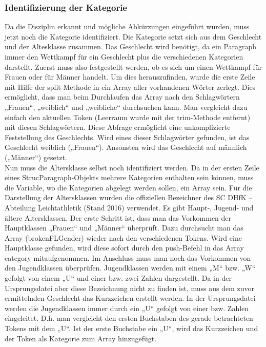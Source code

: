 {\subsubsection{Identifizierung der Kategorie}
Da die Disziplin erkannt und mögliche Abkürzungen eingeführt wurden, muss jetzt noch die Kategorie identifiziert. Die Kategorie setzt sich aus dem Geschlecht und der Altesklasse zusammen. Das Geschlecht wird benötigt, da ein Paragraph immer den Wettkampf für ein Geschlecht plus die verschiedenen Kategorien darstellt. Zuerst muss also festgestellt werden, ob es sich um einen Wettkampf für Frauen oder für Männer handelt. Um dies herauszufinden, wurde die erste Zeile mit Hilfe der split-Methode in ein Array aller vorhandenen Wörter zerlegt. Dies ermöglicht, dass man beim Durchlaufen das Array nach den Schlagwörtern „Frauen“, „weiblich“ und „weibliche“ durchsuchen kann. Man vergleicht dazu einfach den aktuellen Token (Leerraum wurde mit der trim-Methode entfernt) mit diesen Schlagwörtern. Diese Abfrage ermöglicht eine unkomplizierte Feststellung des Geschlechts. Wird eines dieser Schlagwörter gefunden, ist das Geschlecht weiblich („Frauen“). Ansonsten wird das Geschlecht auf männlich („Männer“) gesetzt. \\
Nun muss die Altersklasse selbst noch identifiziert werden. Da in der ersten Zeile eines StrucParagraph-Objekts mehrere Kategorien enthalten sein können, muss die Variable, wo die Kategorien abgelegt werden sollen, ein Array sein. Für die Darstellung der Altersklassen wurden die offiziellen Bezeichner des SC DHfK – Abteilung Leichtathletik (Stand 2016) verwendet. Es gibt Haupt-, Jugend- und ältere Altersklassen.  Der erste Schritt ist, dass man das Vorkommen der Hauptklassen „Frauen“ und „Männer“ überprüft. Dazu durchsucht man das Array (brokenFLGender) wieder nach den verschiedenen Tokens. Wird eine Hauptklasse gefunden, wird diese sofort durch den push-Befehl in das Array category mitaufgenommen.
Im Anschluss muss man noch das Vorkommen von den Jugendklassen überprüfen. Jugendklassen werden mit einem „M“ bzw. „W“ gefolgt von einem  „U“ und einer bzw. zwei Zahlen dargestellt. Da in der Ursprungsdatei aber diese Bezeichnung nicht zu finden ist, muss aus dem zuvor ermittelnden Geschlecht das Kurzzeichen erstellt werden. In der Ursprungsdatei werden die Jugendklassen immer durch ein „U“ gefolgt von einer bzw. Zahlen eingeleitet. D.h. man vergleicht den ersten Buchstaben des gerade betrachteten Tokens mit dem „U“. Ist der erste Buchstabe ein „U“, wird das Kurzzeichen und der Token als Kategorie zum Array hinzugefügt. 
}
